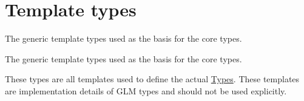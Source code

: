 \hypertarget{group__core__template}{}\section{Template types}
\label{group__core__template}


The generic template types used as the basis for the core types.  


The generic template types used as the basis for the core types. 

These types are all templates used to define the actual \hyperlink{group__core__types}{Types}. These templates are implementation details of G\+LM types and should not be used explicitly. 